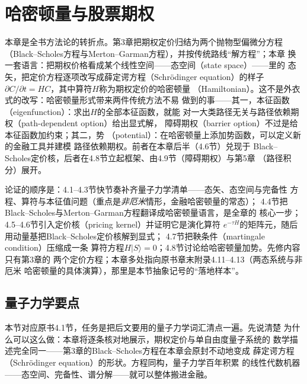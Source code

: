 \chapter{哈密顿量与股票期权}

本章是全书方法论的转折点。第3章把期权定价归结为两个抛物型偏微分方程
（Black--Scholes方程与Merton--Garman方程），并按传统路线“解方程”；本章
换一套语言：把期权价格看成某个线性空间——态空间（state space）——里的
态矢，把定价方程逐项改写成薛定谔方程（Schr\"odinger equation）的样子
$\partial C/\partial t=HC$，其中算符$H$称为期权定价的哈密顿量
（Hamiltonian）。这不是外衣式的改写：哈密顿量形式带来两件传统方法不易
做到的事——其一，本征函数（eigenfunction）：求出$H$的全部本征函数，就能
对一大类路径无关与路径依赖期权（path-dependent option）给出显式解，
障碍期权（barrier option）不过是给本征函数加约束；其二，势
（potential）：在哈密顿量上添加势函数，可以定义新的金融工具并建模
路径依赖期权。前者在本章后半（4.6节）兑现于
Black--Scholes定价核，后者在4.8节立起框架、由4.9节（障碍期权）与第5章
（路径积分）展开。

论证的顺序是：4.1--4.3节快节奏补齐量子力学清单——态矢、态空间与完备性
方程、算符与本征值问题（重点是\emph{非厄米}情形，金融哈密顿量的常态）；
4.4节把Black--Scholes与Merton--Garman方程翻译成哈密顿量语言，是全章的
核心一步；4.5--4.6节引入定价核（pricing kernel）并证明它是演化算符
$e^{-\tau H}$的矩阵元，随后用动量基把Black--Scholes定价核解到显式；
4.7节把鞅条件（martingale condition）压缩成一条
算符方程$H|S\rangle=0$；4.8节讨论给哈密顿量加势。先修内容只有第3章的
两个定价方程；本章多处指向原书章末附录4.11--4.13（两态系统与非厄米
哈密顿量的具体演算），那里是本节抽象记号的“落地样本”。

\section{量子力学要点}

本节对应原书4.1节，任务是把后文要用的量子力学词汇清点一遍。先说清楚
为什么可以这么做：本章将逐条核对地展示，期权定价与单自由度量子系统的
数学描述完全同一——第3章的Black--Scholes方程在本章会原封不动地变成
薛定谔方程（Schr\"odinger equation）的形状。方程同构，量子力学百年积累
的线性代数机器——态空间、完备性、谱分解——就可以整体搬进金融。

